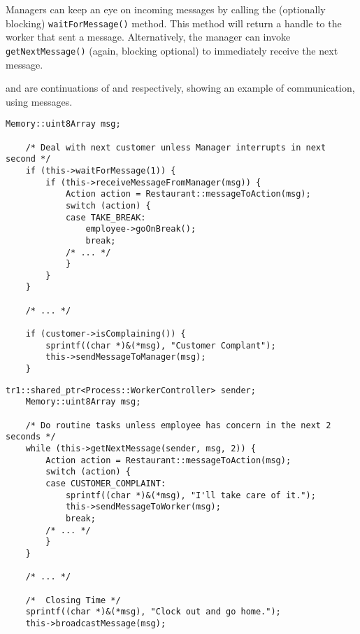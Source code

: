 Managers can keep an eye on incoming messages by calling the
(optionally blocking) \texttt{wait\-For\-Message()} method.  This method will
return a handle to the worker that sent a message.  Alternatively, the
manager can invoke \texttt{get\-Next\-Message()} (again, blocking 
optional) to immediately receive the next message.

 and 
 are continuations of
 and 
respectively, showing an example of communication, using 
messages.

\begin{lstlisting}[caption={\class{Worker} Communication}, label=lst:process-worker-communication-example]
	Memory::uint8Array msg;

	/* Deal with next customer unless Manager interrupts in next second */
	if (this->waitForMessage(1)) {
		if (this->receiveMessageFromManager(msg)) {
			Action action = Restaurant::messageToAction(msg);
			switch (action) {
			case TAKE_BREAK:
				employee->goOnBreak();
				break;
			/* ... */
			}
		}
	}
	
	/* ... */
	
	if (customer->isComplaining()) {
		sprintf((char *)&(*msg), "Customer Complant");
		this->sendMessageToManager(msg);
	}
\end{lstlisting}
\begin{lstlisting}[caption={\class{Manager} Communication}, label=lst:process-manager-communication-example]
	tr1::shared_ptr<Process::WorkerController> sender;
	Memory::uint8Array msg;
	
	/* Do routine tasks unless employee has concern in the next 2 seconds */
	while (this->getNextMessage(sender, msg, 2)) {
		Action action = Restaurant::messageToAction(msg);
		switch (action) {
		case CUSTOMER_COMPLAINT:
			sprintf((char *)&(*msg), "I'll take care of it.");
			this->sendMessageToWorker(msg);
			break;
		/* ... */
		}
	}
	
	/* ... */
	
	/*  Closing Time */
	sprintf((char *)&(*msg), "Clock out and go home.");
	this->broadcastMessage(msg);
\end{lstlisting}
